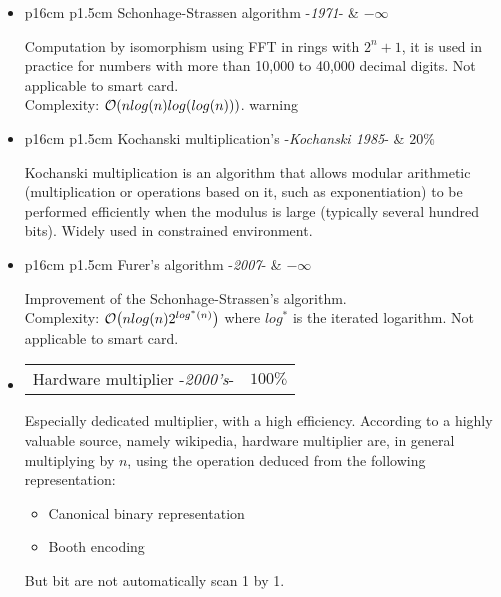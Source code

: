 \begin{itemize}
	\item  	\begin{tabularx}{\linewidth}{ p{16cm} p{1.5cm}}
			Schonhage-Strassen algorithm -\textit{1971}-  & $ -\infty $
			\end{tabularx}	
			\noindent
			Computation by isomorphism using FFT in rings with $2^n+1$, it is used in practice
			for numbers with more than 10,000 to 40,000 decimal digits. Not applicable to smart card.\\
			Complexity: $\mathop{}\mathopen{}\mathcal{O}\mathopen{}\left(nlog(n)log(log(n))\right)$. warning

	\item  	\begin{tabularx}{\linewidth}{ p{16cm} p{1.5cm}}
			Kochanski multiplication's -\textit{Kochanski 1985}-  & $20\%$ 
			\end{tabularx}	
			\noindent
			Kochanski multiplication is an algorithm that allows modular arithmetic (multiplication or 
			operations based on it, such as exponentiation) to be performed efficiently when the modulus 
			is large (typically several hundred bits). Widely used in constrained environment.
			
			

	\item  	\begin{tabularx}{\linewidth}{ p{16cm} p{1.5cm}}
			Furer's algorithm -\textit{2007}-  & $ -\infty $  
			\end{tabularx}	
			\noindent
			Improvement of the Schonhage-Strassen's algorithm.\\
			Complexity:  $\mathop{}\mathopen{}\mathcal{O}\mathopen{}\left(nlog(n)2^{ log^{*}(n)} \right)$ where $ log^{*} $ is the iterated logarithm.
			Not applicable to smart card.

	\item  	\begin{tabularx}{\linewidth}{ p{16cm} p{1.5cm}}
			Hardware multiplier -\textit{2000's}-  & $100\%$  
			\end{tabularx}	
			\noindent
			Especially dedicated multiplier, with a high efficiency.	
			According to a highly valuable source, namely wikipedia, hardware multiplier are,
			in general multiplying by $n$, using  the operation deduced from the following
			representation:
			\begin{itemize}
				\item Canonical binary representation
				\item Booth encoding
			\end{itemize}		
			But bit are not automatically scan 1 by 1.	
					


\end{itemize}
